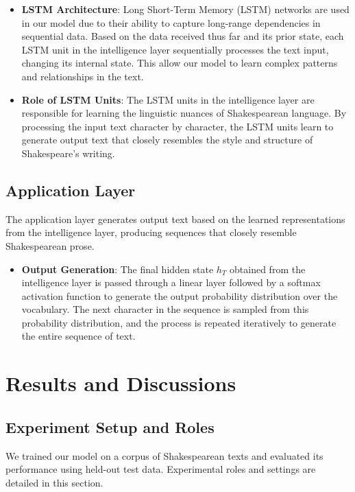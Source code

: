 \documentclass[conference]{IEEEtran}
\begin{document}
\begin{itemize}
    \item \textbf{LSTM Architecture}: Long Short-Term Memory \cite{chakraborty2020study}(LSTM) networks are used in our model due to their ability to capture long-range dependencies in sequential data. Based on the data received thus far and its prior state, each LSTM unit in the intelligence layer sequentially processes the text input, changing its internal state. This allow our model to learn complex patterns and relationships in the text.
    
    \item \textbf{Role of LSTM Units}: The LSTM units in the intelligence layer are responsible for learning the linguistic nuances of Shakespearean language. By processing the input text character by character, the LSTM units learn to generate output text that closely resembles the style and structure of Shakespeare's writing.
\end{itemize}


\subsection{Application Layer}
The application layer generates output text based on the learned representations from the intelligence layer, producing sequences that closely resemble Shakespearean prose.

\begin{itemize}
    \item \textbf{Output Generation}: The final hidden state $h_T$ obtained from the intelligence layer is passed through a linear layer followed by a softmax activation function to generate the output probability distribution over the vocabulary. The next character in the sequence is sampled from this probability distribution\cite{pandey2023natural}, and the process is repeated iteratively to generate the entire sequence of text.
\end{itemize}

\section{Results and Discussions}
\subsection{Experiment Setup and Roles}
We trained our model on a corpus of Shakespearean texts and evaluated its performance using held-out test data. Experimental roles and settings are detailed in this section.
\end{document}
